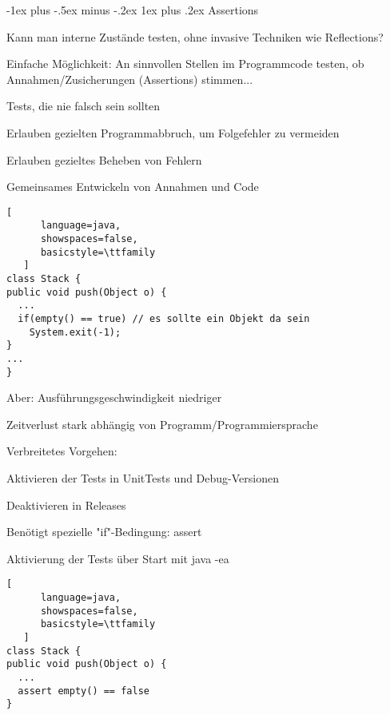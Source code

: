 \documentclass[10pt]{article}
\makeatletter
\renewcommand{\subsubsection}{\@startsection{subsubsection}{3}{0mm}%
                                {-1ex plus -.5ex minus -.2ex}%
                                {1ex plus .2ex}%
                                {\normalfont\small\bfseries}}
\makeatother
\begin{document}
\subsubsection{Assertions}
\begin{itemize*}
  \item Kann man interne Zustände testen, ohne invasive Techniken wie Reflections?
  \item Einfache Möglichkeit: An sinnvollen Stellen im Programmcode testen, ob Annahmen/Zusicherungen (Assertions) stimmen...
  \item Tests, die nie falsch sein sollten
  \begin{itemize*}
    \item Erlauben gezielten Programmabbruch, um Folgefehler zu vermeiden
    \item Erlauben gezieltes Beheben von Fehlern
    \item Gemeinsames Entwickeln von Annahmen und Code
  \end{itemize*}
\end{itemize*}

\begin{lstlisting}[
      language=java,
      showspaces=false,
      basicstyle=\ttfamily
   ]
class Stack {
public void push(Object o) {
  ...
  if(empty() == true) // es sollte ein Objekt da sein
    System.exit(-1);
}
...
}
\end{lstlisting}


Aber: Ausführungsgeschwindigkeit niedriger
\begin{itemize*}
  \item Zeitverlust stark abhängig von Programm/Programmiersprache
  \item Verbreitetes Vorgehen:
  \begin{itemize*}
    \item Aktivieren der Tests in UnitTests und Debug-Versionen
    \item Deaktivieren in Releases
    \item Benötigt spezielle "if"-Bedingung: assert
  \end{itemize*}
  \item Aktivierung der Tests über Start mit java -ea
\end{itemize*}
\begin{lstlisting}[
      language=java,
      showspaces=false,
      basicstyle=\ttfamily
   ]
class Stack {
public void push(Object o) {
  ...
  assert empty() == false
}
\end{lstlisting}
\end{document}
